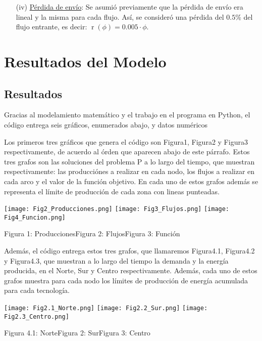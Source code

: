 \documentclass[12pt,twoside]{article}
\begin{document}
\begin{itemize}
		\item [(iv)] \underline{P\'erdida de env\'io}: Se asumi\'o previamente que la p\'erdida de env\'io era lineal y la misma para cada flujo. As\'i, se consider\'o una p\'erdida del \(0.5\%\) del flujo entrante, es decir: \(\operatorname{r}(\phi)=0.005\cdot\phi\).
	\end{itemize}
	\section{Resultados del Modelo}
	\subsection{Resultados}
	
	\hspace{1cm} Gracias al modelamiento matemático y el trabajo en el programa en Python, el c\'odigo entrega seis gr\'aficos, enumerados abajo, y datos num\'ericos 
	
	\hspace{1cm} Los primeros tres gr\'aficos que genera el c\'odigo son Figura1, Figura2 y Figura3 respectivamente, de acuerdo al \'orden que aparecen abajo de este p\'arrafo. Estos tres grafos son las soluciones del problema P a lo largo del tiempo, que muestran respectivamente: las producci\'ones a realizar en cada nodo, los flujos a realizar en cada arco y el valor de la funci\'on objetivo. En cada uno de estos grafos adem\'as se representa el l\'imite de producci\'on de cada zona con lineas punteadas.
	
	\texttt{[image: Fig2\_Producciones.png]}
	\texttt{[image: Fig3\_Flujos.png]}
	\texttt{[image: Fig4\_Funcion.png]}
	\begin{center}Figura 1: Producciones\hspace{2.5cm}Figura 2: Flujos\hspace{2.7cm}Figura 3: Funci\'on\hspace{0.5cm}\, \end{center}
	
	\hspace{1cm} Adem\'as, el c\'odigo entrega estos tres grafos, que llamaremos Figura4.1, Figura4.2 y Figura4.3, que muestran a lo largo del tiempo la demanda y la energ\'ia producida, en el Norte, Sur y Centro respectivamente. Adem\'as, cada uno de estos grafos muestra para cada nodo los l\'imites de producci\'on de energ\'ia acumulada para cada tecnolog\'ia.
	
	\texttt{[image: Fig2.1\_Norte.png]}
	\texttt{[image: Fig2.2\_Sur.png]}
	\texttt{[image: Fig2.3\_Centro.png]}
	\begin{center}Figura 4.1: Norte\hspace{3.2cm}Figura 2: Sur\hspace{3.2cm}Figura 3: Centro \end{center}
	
\end{document}

